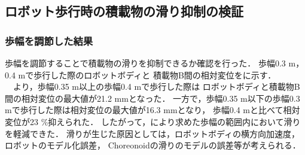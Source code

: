 \begin{table}[t]
    \caption{Verification condition}
    \begin{center}
        
    \end{center}
\end{table}

\subsection{ロボット歩行時の積載物の滑り抑制の検証}
\subsubsection{歩幅を調節した結果}
\label {4.1.3}
歩幅を調節することで積載物の滑りを抑制できるか確認を行った．
歩幅0.3 m，0.4 mで歩行した際のロボットボディと
積載物B間の相対変位をに示す．\\
　より，歩幅0.35 m以上の歩幅0.4 mで歩行した際は
ロボットボディと積載物B間の相対変位の最大値が21.2 mmとなった．
一方で，歩幅0.35 m以下の歩幅0.3 mで歩行した際は相対変位の最大値が16.3 mmとなり，
歩幅0.4 mと比べて相対変位が23 \%抑えられた．
したがって，により求めた歩幅の範囲内において滑りを軽減できた．
滑りが生じた原因としては，ロボットボディの横方向加速度，ロボットのモデル化誤差，
Choreonoidの滑りのモデルの誤差等が考えられる．\\


